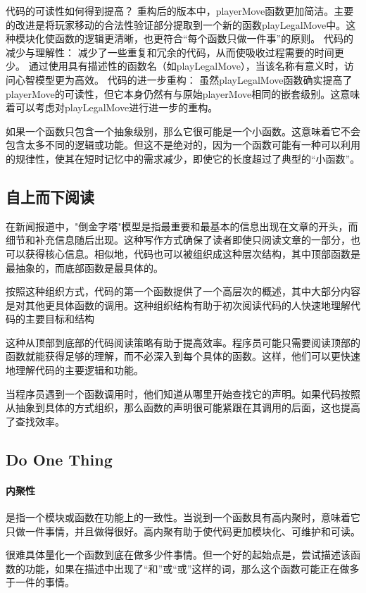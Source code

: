 \documentclass[]{ctexbook}
\begin{document}
代码的可读性如何得到提高？
重构后的版本中，playerMove函数更加简洁。主要的改进是将玩家移动的合法性验证部分提取到一个新的函数playLegalMove中。这种模块化使函数的逻辑更清晰，也更符合“每个函数只做一件事”的原则。
代码的减少与理解性：
减少了一些重复和冗余的代码，从而使吸收过程需要的时间更少。
通过使用具有描述性的函数名（如playLegalMove），当该名称有意义时，访问心智模型更为高效。
代码的进一步重构：
虽然playLegalMove函数确实提高了playerMove的可读性，但它本身仍然有与原始playerMove相同的嵌套级别。这意味着可以考虑对playLegalMove进行进一步的重构。

如果一个函数只包含一个抽象级别，那么它很可能是一个小函数。这意味着它不会包含太多不同的逻辑或功能。但这不是绝对的，因为一个函数可能有一种可以利用的规律性，使其在短时记忆中的需求减少，即使它的长度超过了典型的“小函数”。

\subsection{自上而下阅读}
在新闻报道中，"倒金字塔"模型是指最重要和最基本的信息出现在文章的开头，而细节和补充信息随后出现。这种写作方式确保了读者即使只阅读文章的一部分，也可以获得核心信息。相似地，代码也可以被组织成这种层次结构，其中顶部函数是最抽象的，而底部函数是最具体的。

按照这种组织方式，代码的第一个函数提供了一个高层次的概述，其中大部分内容是对其他更具体函数的调用。这种组织结构有助于初次阅读代码的人快速地理解代码的主要目标和结构

这种从顶部到底部的代码阅读策略有助于提高效率。程序员可能只需要阅读顶部的函数就能获得足够的理解，而不必深入到每个具体的函数。这样，他们可以更快速地理解代码的主要逻辑和功能。

当程序员遇到一个函数调用时，他们知道从哪里开始查找它的声明。如果代码按照从抽象到具体的方式组织，那么函数的声明很可能紧跟在其调用的后面，这也提高了查找效率。

\subsection{Do One Thing}
\paragraph{内聚性}是指一个模块或函数在功能上的一致性。当说到一个函数具有高内聚时，意味着它只做一件事情，并且做得很好。高内聚有助于使代码更加模块化、可维护和可读。

很难具体量化一个函数到底在做多少件事情。但一个好的起始点是，尝试描述该函数的功能，如果在描述中出现了“和”或“或”这样的词，那么这个函数可能正在做多于一件的事情。
\end{document}
